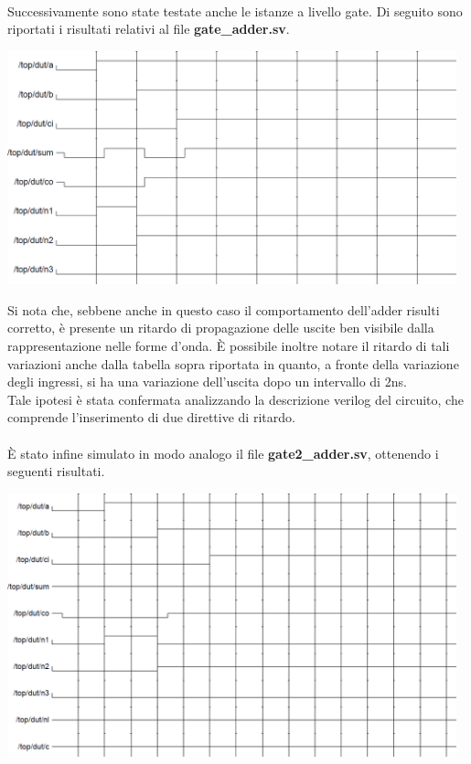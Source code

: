 \documentclass[11pt,  english, makeidx, a4paper, titlepage, oneside]{book}
\newenvironment{listato}{\footnotesize} {\normalsize }
\begin{document}
\\\\\\
Successivamente sono state testate anche le istanze a livello gate. Di seguito sono riportati i risultati relativi al file \textbf{gate\_adder.sv}.\\
\begin{center}
\begin{listato}
	\centerline{}
\end{listato}
\end{center}
\vspace{0.3cm}
\centerline{\includegraphics[width=13cm]{./img/Lab_6/wave_gate.png}}
\vspace{0.3cm}
Si nota che, sebbene anche in questo caso il comportamento dell'adder risulti corretto, è presente un ritardo di propagazione delle uscite ben visibile dalla rappresentazione nelle forme d'onda. È possibile inoltre notare il ritardo di tali variazioni anche dalla tabella sopra riportata in quanto, a fronte della variazione degli ingressi, si ha una variazione dell'uscita dopo un intervallo di 2ns.\\
Tale ipotesi è stata confermata analizzando la descrizione verilog del circuito, che comprende l'inserimento di due direttive di ritardo.\\\\
È stato infine simulato in modo analogo il file \textbf{gate2\_adder.sv}, ottenendo i seguenti risultati.
\begin{center}
\begin{listato}
	\centerline{}
\end{listato}
\end{center}
\vspace{0.3cm}
\centerline{\includegraphics[width=13cm]{./img/Lab_6/wave_gate2.png}}
\end{document}
